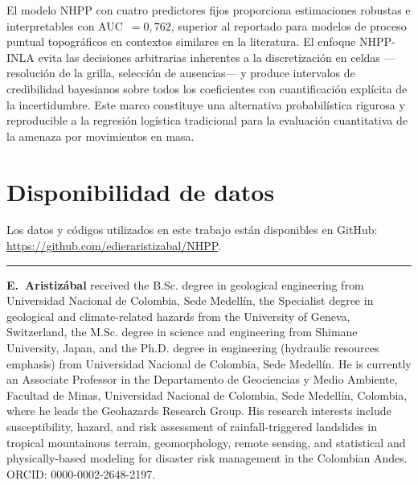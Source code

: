 \documentclass[10pt, twocolumn, letterpaper]{article}
\begin{document}
El modelo NHPP con cuatro predictores fijos proporciona estimaciones robustas e
interpretables con AUC~$= 0{,}762$, superior al reportado para modelos de
proceso puntual topográficos en contextos similares en la literatura. El enfoque
NHPP-INLA evita las decisiones arbitrarias inherentes a la discretización en
celdas ---resolución de la grilla, selección de ausencias--- y produce
intervalos de credibilidad bayesianos sobre todos los coeficientes con
cuantificación explícita de la incertidumbre. Este marco constituye una
alternativa probabilística rigurosa y reproducible a la regresión logística
tradicional para la evaluación cuantitativa de la amenaza por movimientos en
masa.

\section*{Disponibilidad de datos}

Los datos y códigos utilizados en este trabajo están disponibles en GitHub:
\url{https://github.com/edieraristizabal/NHPP}.




\vspace{6pt}
\noindent\rule{\linewidth}{0.4pt}
\vspace{2pt}

{\footnotesize\noindent
\textbf{E.~Aristizábal} received the B.Sc. degree in geological engineering
from Universidad Nacional de Colombia, Sede Medellín, the Specialist degree in
geological and climate-related hazards from the University of Geneva,
Switzerland, the M.Sc. degree in science and engineering from Shimane
University, Japan, and the Ph.D. degree in engineering (hydraulic resources
emphasis) from Universidad Nacional de Colombia, Sede Medellín. He is currently
an Associate Professor in the Departamento de Geociencias y Medio Ambiente,
Facultad de Minas, Universidad Nacional de Colombia, Sede Medellín, Colombia,
where he leads the Geohazards Research Group. His research interests include
susceptibility, hazard, and risk assessment of rainfall-triggered landslides in
tropical mountainous terrain, geomorphology, remote sensing, and statistical and
physically-based modeling for disaster risk management in the Colombian Andes.
ORCID: 0000-0002-2648-2197.}
\end{document}

